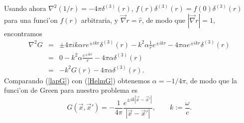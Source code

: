Usando ahora $\nabla^2\left({1}/{r}\right) =-4\pi\delta^{(3)}(r)$,
$f(r)\delta^{(3)}(r)=f(0)\delta^{(3)}(r)$ para una funci'on $f(r)$ arbitraria, y
$\vec{\nabla}r=\hat{r}$, de modo que $|\vec{\nabla}r|=1$,
encontramos
\begin{eqnarray}
\nabla^2G&=&\pm 4\pi ik\alpha r  e^{\pm ikr}\delta^{(3)}(r) -k^2\alpha \frac{1}{r}
e^{\pm ikr}-4\pi\alpha e^{\pm ikr}\delta^{(3)}(r) \\
&=&0-k^2\alpha \frac{e^{\pm ikr}}{r}   -4\pi\alpha \delta^{(3)}(r) \\
&=&-k^2G(r) -4\pi\alpha \delta^{(3)}(r) .\label{lapG}
\end{eqnarray}
Comparando (\ref{lapG}) con (\ref{HelmG}) obtenemos $\alpha=-{1}/{4\pi}$, de
modo que la funci'on de Green para nuestro problema es
\begin{equation}
\boxed{G(\vec{x},\vec{x}')=-\frac{1}{4\pi}\frac{e^{\pm
ik|\vec{x}-\vec{x}'|}}{|\vec{x}-\vec{x}'|}, \qquad k:=\frac{\omega}{c}.} \label{Green}
\end{equation}


